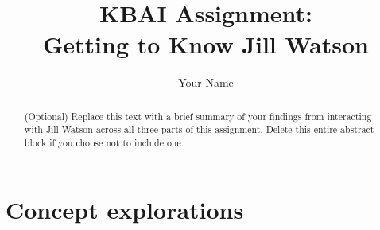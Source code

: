 \documentclass[
	letterpaper, %
]{jdf}
\author{Your Name}
\title{KBAI Assignment:\\Getting to Know Jill Watson}
\begin{document}
\maketitle

\begin{abstract}
	(Optional) Replace this text with a brief summary of your findings from
	interacting with Jill Watson across all three parts of this assignment.
	Delete this entire abstract block if you choose not to include one.
\end{abstract}



\section{Concept explorations}
\end{document}
